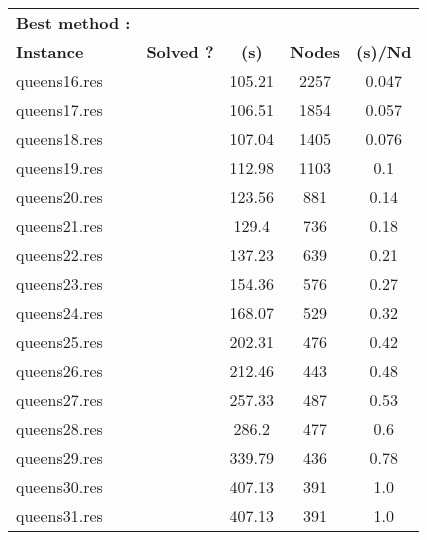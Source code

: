 \documentclass[main.tex]{subfiles}
\begin{document}
\thispagestyle{empty}

\begin{landscape}
\begin{center}
\begin{table}[h]
\centering
\caption{}
\label{}
\renewcommand{\arraystretch}{1.4} 
\begin{tabular}{|l|cccc|}
	\hline
\textbf{Best method :}\\
\textbf{Instance}  & \textbf{Solved ?} & \textbf{(s)} & \textbf{Nodes} & \textbf{(s)/Nd}\\\hline

queens16.res &  & 105.21 & 2257 & 0.047
\\
queens17.res &  & 106.51 & 1854 & 0.057
\\
queens18.res &  & 107.04 & 1405 & 0.076
\\
queens19.res &  & 112.98 & 1103 & 0.1
\\
queens20.res &  & 123.56 & 881 & 0.14
\\
queens21.res &  & 129.4 & 736 & 0.18
\\
queens22.res &  & 137.23 & 639 & 0.21
\\
queens23.res &  & 154.36 & 576 & 0.27
\\
queens24.res &  & 168.07 & 529 & 0.32
\\
queens25.res &  & 202.31 & 476 & 0.42
\\
queens26.res &  & 212.46 & 443 & 0.48
\\
queens27.res &  & 257.33 & 487 & 0.53
\\
queens28.res &  & 286.2 & 477 & 0.6
\\
queens29.res &  & 339.79 & 436 & 0.78
\\
queens30.res &  & 407.13 & 391 & 1.0
\\
queens31.res &  & 407.13 & 391 & 1.0
\\
\hline\end{tabular}
\end{table}
\end{center}
\end{landscape}
\end{document}
